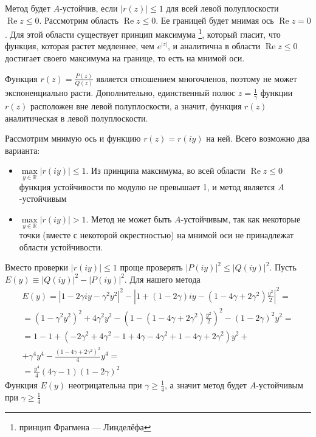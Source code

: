 \documentclass[12pt]{article}
\begin{document}
Метод будет $A$-устойчив, если $|r(z)| \leqslant 1$ для всей левой полуплоскости $\operatorname{Re} z \leqslant 0$. Рассмотрим область $\operatorname{Re} z \leqslant 0$. Ее границей будет мнимая ось $\operatorname{Re} z = 0$. Для этой области существует принцип максимума
\footnote{принцип Фрагмена — Линделёфа}, который гласит, что
функция, которая растет медленнее, чем $e^{|z|}$, и аналитична в области $\operatorname{Re} z \leqslant 0$ достигает своего максимума на границе, то есть на мнимой оси.

Функция $r(z) = \frac{P(z)}{Q(z)}$ является отношением многочленов, поэтому не может экспоненциально расти. Дополнительно, единственный полюс $z = \frac{1}{\gamma}$ функции $r(z)$ расположен вне левой полуплоскости, а значит, функция $r(z)$ аналитическая в левой полуплоскости.

Рассмотрим мнимую ось и функцию $r(z) = r(iy)$ на ней. Всего возможно два варианта: \begin{itemize}
	\item $\max\limits_{y \in \mathbb{R}} |r(iy)| \leqslant 1$. Из принципа максимума, во всей области $\operatorname{Re} z \leqslant 0$ функция устойчивости по модулю не превышает 1, и метод является $A$-устойчивым
	\item $\max\limits_{y \in \mathbb{R}} |r(iy)| > 1$. Метод не может быть $A$-устойчивым, так как некоторые точки (вместе с некоторой окрестностью) на мнимой оси не принадлежат области устойчивости.
\end{itemize}

Вместо проверки $|r(iy)| \leqslant 1$ проще проверять $|P(iy)|^2 \leqslant |Q(iy)|^2$. Пусть $E(y) \equiv |Q(iy)|^2-|P(iy)|^2$. Для нашего метода
\begin{multline*}
E(y) = |1 -2\gamma iy - \gamma^2 y^2|^2 - \left|1 + (1-2\gamma)iy-(1-4\gamma+2\gamma^2) \frac{y^2}{2}\right|^2 = \\ =
(1 - \gamma^2 y^2)^2 + 4 \gamma^2 y^2 - \left(1 -(1-4\gamma+2\gamma^2) \frac{y^2}{2}\right)^2 - (1 - 2 \gamma)^2 y^2 = \\ = 1 - 1 + (-2\gamma^2 + 4\gamma^2 - 1 + 4\gamma - 4 \gamma^2 + 1 -4\gamma + 2\gamma^2)y^2 + \\ +
\gamma^4 y^4 - \frac{(1 - 4\gamma + 2\gamma^2)^2}{4}y^4 = \\ =
\frac{y^4}{4}(4\gamma - 1)(1-2\gamma)^2
\end{multline*}
Функция $E(y)$ неотрицательна при $\gamma \geqslant \frac{1}{4}$, а значит метод будет $A$-устойчивым при $\gamma \geqslant \frac{1}{4}$
\end{document}
